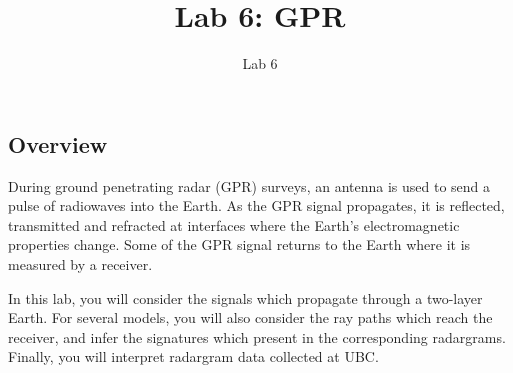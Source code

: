 \documentclass[twosides]{EOSC350Lab} %
\title{Lab 6: GPR}
\subtitle{Lab 6}
\begin{document}

\begin{framed}



\section*{Overview}
During ground penetrating radar (GPR) surveys, an antenna is used to send a pulse of radiowaves into the Earth.
As the GPR signal propagates, it is reflected, transmitted and refracted at interfaces where the Earth's electromagnetic properties change.
Some of the GPR signal returns to the Earth where it is measured by a receiver.



In this lab, you will consider the signals which propagate through a two-layer Earth.
For several models, you will also consider the ray paths which reach the receiver, and infer the signatures which present in the corresponding radargrams.
Finally, you will interpret radargram data collected at UBC.







\end{framed}
\end{document}
